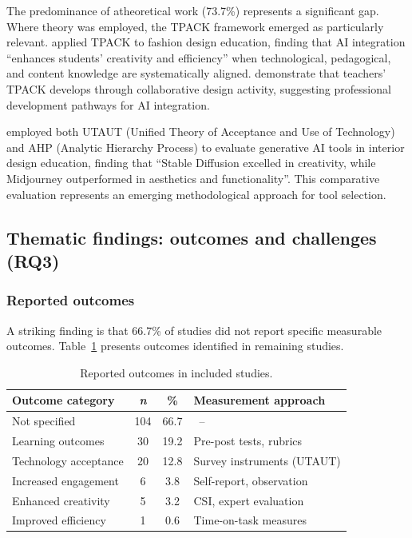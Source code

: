 \documentclass[ed]{acnsart}
\begin{document}
The predominance of atheoretical work (73.7\%) represents a significant gap. Where theory was employed, the TPACK framework emerged as particularly relevant. \citet{Lee2024} applied TPACK to fashion design education, finding that AI integration ``enhances students' creativity and efficiency'' when technological, pedagogical, and content knowledge are systematically aligned. \citet{Boschman2015} demonstrate that teachers' TPACK develops through collaborative design activity, suggesting professional development pathways for AI integration.

\citet{Liu2025} employed both UTAUT (Unified Theory of Acceptance and Use of Technology) and AHP (Analytic Hierarchy Process) to evaluate generative AI tools in interior design education, finding that ``Stable Diffusion excelled in creativity, while Midjourney outperformed in aesthetics and functionality''. This comparative evaluation represents an emerging methodological approach for tool selection.

\subsection{Thematic findings: outcomes and challenges (RQ3)}

\subsubsection{Reported outcomes}

A striking finding is that 66.7\% of studies did not report specific measurable outcomes. Table~\ref{tab:outcomes} presents outcomes identified in remaining studies.

\begin{table}[htbp]
\centering
\caption{Reported outcomes in included studies.}
\label{tab:outcomes}
\small
\begin{tabular}{@{}lccl@{}}
\toprule
\hfill \textbf{Outcome category} & \textbf{\textit{n}} & \textbf{\%} & \hfill \textbf{Measurement approach} \\
\midrule
Not specified & 104 & 66.7 & ~--  \\
Learning outcomes & 30 & 19.2 & Pre-post tests, rubrics \\
Technology acceptance & 20 & 12.8 & Survey instruments (UTAUT) \\
Increased engagement & 6 & 3.8 & Self-report, observation \\
Enhanced creativity & 5 & 3.2 & CSI, expert evaluation \\
Improved efficiency & 1 & 0.6 & Time-on-task measures \\
\bottomrule
\end{tabular}
\end{table}
\end{document}
